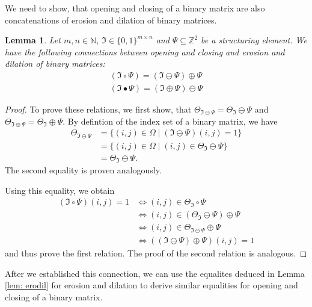 \documentclass[a4paper,12pt]{article}
\theoremstyle{plain}
\newtheorem{lemma}[theorem]{Lemma}
\theoremstyle{definition}
\begin{document}
We need to show, that opening and closing of a binary matrix are also concatenations of erosion and dilation of binary matrices.

\begin{lemma}
	Let $m, n \in \mathbb{N}$, $\mathfrak{I} \in \{ 0, 1 \}^{m \times n}$ and $\Psi \subseteq \mathbb{Z}^2$ be a structuring element. We have the following connections between opening and closing and erosion and dilation of binary matrices:
	\begin{align}
		(\mathfrak{I} \circ \Psi) = (\mathfrak{I} \ominus \Psi) \oplus \Psi \\
		(\mathfrak{I} \bullet \Psi) = (\mathfrak{I} \oplus \Psi) \ominus \Psi
	\end{align}
\end{lemma}
\begin{proof}
	To prove these relations, we first show, that $\Theta_{\mathfrak{I} \ominus \Psi} = \Theta_\mathfrak{I} \ominus \Psi$ and $\Theta_{\mathfrak{I} \oplus \Psi} = \Theta_\mathfrak{I} \oplus \Psi$. By defintion of the index set of a binary matrix, we have
	\begin{align*}
		\Theta_{\mathfrak{I} \ominus \Psi} &= \{ (i, j) \in \Omega \mid (\mathfrak{I} \ominus \Psi)(i, j) = 1 \} \\
		&= \{ (i, j) \in \Omega \mid (i, j) \in \Theta_\mathfrak{I} \ominus \Psi \} \\
		&= \Theta_\mathfrak{I} \ominus \Psi.
	\end{align*}
	The second equality is proven analogously.
	
	Using this equality, we obtain
	\begin{align*}
		(\mathfrak{I} \circ \Psi)(i, j) = 1 &\Leftrightarrow (i, j) \in \Theta_\mathfrak{I} \circ \Psi \\
		&\Leftrightarrow (i, j) \in (\Theta_\mathfrak{I} \ominus \Psi) \oplus \Psi \\
		&\Leftrightarrow (i, j) \in \Theta_{\mathfrak{I} \ominus \Psi} \oplus \Psi \\
		&\Leftrightarrow ((\mathfrak{I} \ominus \Psi) \oplus \Psi)(i, j) = 1
	\end{align*}
	and thus prove the first relation. The proof of the second relation is analogous.
\end{proof}

After we established this connection, we can use the equalites deduced in Lemma \ref{lem: erodil} for erosion and dilation to derive similar equalities for opening and closing of a binary matrix.
\end{document}

